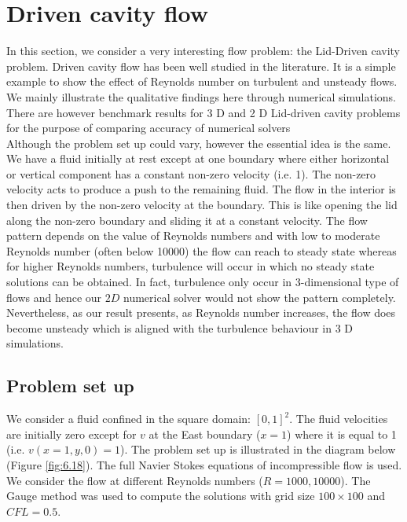 \newpage
\section{Driven cavity flow}
In this section, we consider a very interesting flow problem: the Lid-Driven cavity problem. Driven cavity flow has been well studied in the literature. It is a simple example to show the effect of Reynolds number on turbulent and unsteady flows. We mainly illustrate the qualitative findings here through numerical simulations. There are however benchmark results for 3 D and 2 D Lid-driven cavity problems for the purpose of comparing accuracy of numerical solvers \cite{botella1998benchmark, erturk2005numerical, bruneau20062d}\\

Although the problem set up could vary, however the essential idea is the same. We have a fluid initially at rest except at one boundary where either horizontal or vertical component has a constant non-zero velocity (i.e. 1). The non-zero velocity acts to produce a push to the remaining fluid. The flow in the interior is then driven by the non-zero velocity at the boundary. This is like opening the lid along the non-zero boundary and sliding it at a constant velocity. The flow pattern depends on the value of Reynolds numbers and with low to moderate Reynolds number (often below 10000) the flow can reach to steady state whereas for higher Reynolds numbers, turbulence will occur in which no steady state solutions can be obtained. In fact, turbulence only occur in 3-dimensional type of flows and hence our $2D$ numerical solver would not show the pattern completely. Nevertheless, as our result presents, as Reynolds number increases, the flow does become unsteady which is aligned with the turbulence behaviour in 3 D simulations.

\subsection{Problem set up}
We consider a fluid confined in the square domain: $[0,1]^2$. The fluid velocities are initially zero except for $v$ at the East boundary ($x=1$) where it is equal to 1 (i.e. $v(x=1,y,0)=1$). The problem set up is illustrated in the diagram below (Figure \ref{fig:6.18}). The full Navier Stokes equations of incompressible flow is used. We consider the flow at different Reynolds numbers ($R = 1000, 10000$). The Gauge method was used to compute the solutions with grid size $100 \times 100$ and $CFL = 0.5$. \\


